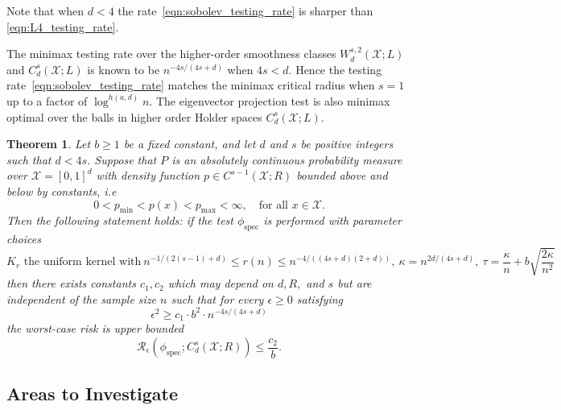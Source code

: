 \documentclass{article}
\newcommand{\1}{\mathbf{1}}
\newcommand{\Xset}{\mathcal{X}}
\newcommand{\spec}{\mathrm{spec}}
\theoremstyle{alden}
\theoremstyle{aldenthm}
\newtheorem{theorem}{Theorem}
\theoremstyle{definition}
\theoremstyle{remark}
\begin{document}
Note that when $d < 4$ the rate~\eqref{eqn:sobolev_testing_rate} is sharper than \eqref{eqn:L4_testing_rate}. 

The minimax testing rate over the higher-order smoothness classes $W_d^{s,2}(\Xset;L)$ and $C_d^s(\Xset;L)$ is known to be $n^{-4s/(4s + d)}$ when $4s < d$. Hence the testing rate~\eqref{eqn:sobolev_testing_rate} matches the minimax critical radius when $s = 1$ up to a factor of $\log^{h(a,d)}n$. The eigenvector projection test is also minimax optimal over the balls in higher order Holder spaces $C_d^s(\Xset;L)$.

\begin{theorem}
	\label{thm:higher_order_holder_testing_rate}
	Let $b \geq 1$ be a fixed constant, and let $d$ and $s$ be positive integers such that $d < 4s$. Suppose that $P$ is an absolutely continuous probability measure over $\mathcal{X} = [0,1]^d$ with density function $p \in C^{s-1}(\mathcal{X};R)$ bounded above and below by constants, i.e
	\begin{equation*}
	0 < p_{\min} < p(x) < p_{\max} < \infty, \quad \textrm{for all $x \in \mathcal{X}$.}
	\end{equation*}
	Then the following statement holds: if the test $\phi_{\spec}$ is performed with parameter choices 
	\begin{equation*}
	\textrm{$K_r$ the uniform kernel with}~ n^{-1/(2(s - 1) + d)} \leq r(n) \leq n^{-4/((4s + d)(2+d))}, ~\kappa = n^{2d/(4s + d)}, ~\tau = \frac{\kappa}{n} + b\sqrt{\frac{2\kappa}{n^2}}
	\end{equation*}
	then there exists constants $c_1,c_2$ which may depend on $d,R,$ and $s$ but are independent of the sample size $n$ such that for every $\epsilon \geq 0$ satisfying
	\begin{equation}
	\label{eqn:higher_order_holder_testing_rate}
	\epsilon^2 \geq c_1 \cdot b^2 \cdot n^{-4s/(4s + d)}
	\end{equation}
	the worst-case risk is upper bounded
	\begin{equation}
	\label{eqn:higher_order_holder_testing_rate_1}
	\mathcal{R}_{\epsilon}(\phi_{\mathrm{spec}}; C_d^{s}(\mathcal{X};R)) \leq \frac{c_2}{b}.
	\end{equation}
\end{theorem}

\subsection{Areas to Investigate}
\end{document}
